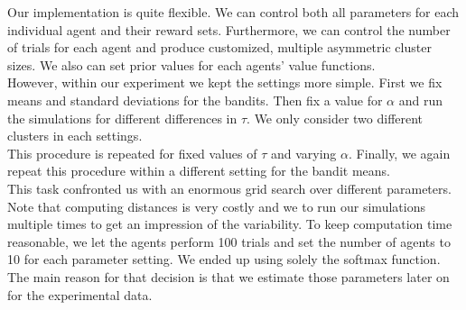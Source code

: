 \documentclass[12pt,a4paper,bibliography=totocnumbered,listof=totocnumbered]{scrartcl}
\begin{document}
Our implementation is quite flexible. We can control both all parameters for each individual agent and their reward sets. Furthermore, we can control the number of trials for each agent and produce customized, multiple asymmetric cluster sizes. We also can set prior values for each agents' value functions.\\ 
However, within our experiment we kept the settings more simple. First we fix means and standard deviations for the bandits. Then fix a value for $\alpha$ and run the simulations for different differences in $\tau$. We only consider two different clusters in each settings.\\
This procedure is repeated for fixed values of $\tau$ and varying $\alpha$. Finally, we again repeat this procedure within a different setting for the bandit means.\\
This task confronted us with an enormous grid search over different parameters. Note that computing distances is very costly and we to run our simulations multiple times to get an impression of the variability. To keep computation time reasonable, we let the agents perform 100 trials and set the number of agents to 10 for each parameter setting. We ended up using solely the softmax function. The main reason for that decision is that we estimate those parameters later on for the experimental data.\\ 
\end{document}

